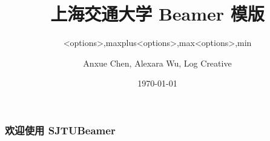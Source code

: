 \documentclass[
    aspectratio=169
]{ctexbeamer}
\begin{document}
\title[SJTU Beamer Template] %
{\textbf{上海交通大学 Beamer 模版}} %

\author[Anxue Chen, Alexara Wu, Log Creative]
{Anxue Chen, Alexara Wu, Log Creative}


\date{\today}

\subtitle{<options>,maxplus}
\logo{\resizebox{!}{0.7cm}{\cnlogo}}
\maketitle[maxplus]
\makebottom[maxplus]

\subtitle{<options>,max}
\logo{\resizebox{!}{1cm}{\sjtubadge}}
\titlegraphic{\sjtubg[opacity=0.2]}
\maketitle[max]
\begin{frame}
  \frametitle{欢迎使用 SJTUBeamer}
\end{frame}
\makebottom[max]

\subtitle{<options>,min}
\logo{\resizebox{!}{0.7cm}{\enlogo}}
\maketitle[min]
\makebottom[min]
\end{document}
